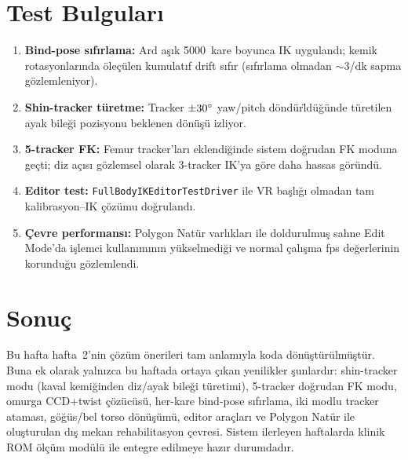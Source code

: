 \documentclass[11pt,a4paper]{article}
\begin{document}
\section{Test Bulgular{\i}}
\label{sec:test}

\begin{enumerate}[nosep]
    \item \textbf{Bind-pose s{\i}f{\i}rlama:} Ard a\c{s}{\i}k 5000~kare
          boyunca IK uyguland{\i}; kemik rotasyonlar{\i}nda \"ole\c{c}\"ulen
          kumulat{\i}f drift s{\i}f{\i}r (s{\i}f{\i}rlama olmadan
          $\sim$3\degree/dk sapma g\"ozlemleniyor).

    \item \textbf{Shin-tracker t\"uretme:} Tracker $\pm30\degree$
          yaw/pitch d\"ond\"ur\"ld\"u\u{g}\"unde t\"uretilen ayak bile\u{g}i
          pozisyonu beklenen d\"on\"u\c{s}\"u izliyor.

    \item \textbf{5-tracker FK:} Femur tracker'lar{\i} eklendi\u{g}inde
          sistem do\u{g}rudan FK moduna ge\c{c}ti; diz a\c{c}{\i}s{\i}
          g\"ozlemsel olarak 3-tracker IK'ya g\"ore daha hassas g\"or\"und\"u.

    \item \textbf{Editor test:} \texttt{FullBodyIKEditorTestDriver}
          ile VR ba\c{s}l{\i}\u{g}{\i} olmadan tam kalibrasyon--IK
          \c{c}\"oz\"umu do\u{g}ruland{\i}.

    \item \textbf{\c{C}evre performans{\i}:} Polygon Nat\"ur
          varlıklar{\i} ile doldurulmu\c{s} sahne Edit Mode'da
          i\c{s}lemci kullan{\i}m{\i}n{\i}n y\"ukselmedi\u{g}i ve
          normal \c{c}al{\i}\c{s}ma fps de\u{g}erlerinin korundu\u{g}u
          g\"ozlemlendi.
\end{enumerate}

\section{Sonu\c{c}}
\label{sec:sonuc}

Bu hafta hafta~2'nin \c{c}\"oz\"um \"onerileri tam anlamıyla koda
d\"on\"u\c{s}t\"ur\"ulm\"u\c{s}t\"ur. Buna ek olarak yalnızca bu
haftada ortaya \c{c}{\i}kan yenilikler \c{s}unlardır: shin-tracker
modu (kaval kemi\u{g}inden diz/ayak bile\u{g}i t\"uretimi),
5-tracker do\u{g}rudan FK modu, omurga CCD+twist \c{c}\"oz\"uc\"us\"u,
her-kare bind-pose s{\i}f{\i}rlama, iki modlu tracker atamas{\i},
g\"o\u{g}\"us/bel torso d\"on\"u\c{s}\"um\"u, editor araçlar{\i} ve
Polygon Nat\"ur ile olu\c{s}turulan d{\i}\c{s} mekan rehabilitasyon
\c{c}evresi. Sistem ilerleyen haftalarda klinik ROM \"ol\c{c}\"um
mod\"ul\"u ile entegre edilmeye haz{\i}r durumdad{\i}r.
\end{document}
